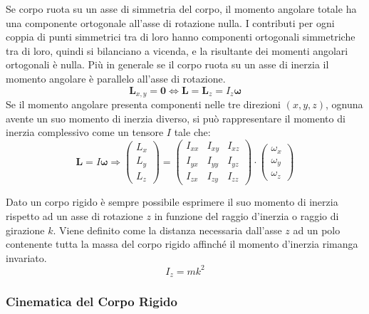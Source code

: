 \documentclass{article}
\newcommand{\vect}[1]{\boldsymbol{\mathbf{#1}}}
\numberwithin{equation}{subsection}
\begin{document}
Se corpo ruota su un asse di simmetria del corpo, il momento angolare totale ha una componente ortogonale all'asse di rotazione nulla. I contributi per ogni coppia di 
punti simmetrici tra di loro hanno componenti ortogonali simmetriche tra di loro, quindi si bilanciano a vicenda, e la risultante dei momenti angolari ortogonali è nulla. 
Più in generale se il corpo ruota su un asse di inerzia il momento angolare è parallelo all'asse di rotazione. 
\begin{equation}
    \vect{L}_{x,y}=\vect{0}\iff\vect{L}=\vect{L}_z=I_z\vect{\omega}
\end{equation}
Se il momento angolare presenta componenti 
nelle tre direzioni $(x,y,z)$, ognuna avente un suo momento 
di inerzia diverso, si può rappresentare il momento di inerzia 
complessivo come un tensore $I$ tale che:
\begin{equation*}
    \vect{L}=I\vect{\omega}\Rightarrow
    \begin{pmatrix}
        L_x\\
        L_y\\
        L_z
    \end{pmatrix}=
    \begin{pmatrix}
        I_{xx} & I_{xy} & I_{xz}\\
        I_{yx} & I_{yy} & I_{yz}\\
        I_{zx} & I_{zy} & I_{zz}
    \end{pmatrix}\cdot
    \begin{pmatrix}
        \omega_x\\
        \omega_y\\
        \omega_z
    \end{pmatrix}
\end{equation*}

Dato un corpo rigido è sempre possibile esprimere il suo momento di inerzia rispetto ad un asse di rotazione $z$ in funzione del raggio d'inerzia o raggio di girazione $k$. 
Viene definito come la distanza necessaria dall'asse $z$ ad un polo contenente tutta la massa del corpo rigido affinché il momento d'inerzia rimanga invariato. 
\begin{equation*}
    I_z=mk^2
\end{equation*}

\subsubsection{Cinematica del Corpo Rigido}
\end{document}
